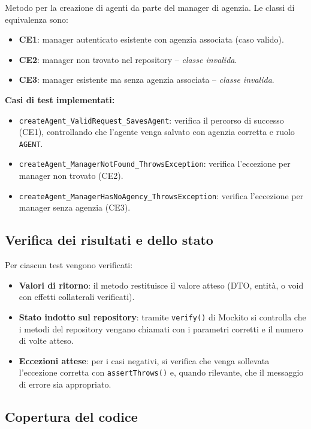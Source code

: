 \documentclass[a4paper,11pt]{report}
\begin{document}
Metodo per la creazione di agenti da parte del manager di agenzia. Le classi di equivalenza sono:

\begin{itemize}[nosep]
  \item \textbf{CE1}: manager autenticato esistente con agenzia associata (caso valido).
  \item \textbf{CE2}: manager non trovato nel repository -- \emph{classe invalida}.
  \item \textbf{CE3}: manager esistente ma senza agenzia associata -- \emph{classe invalida}.
\end{itemize}

\textbf{Casi di test implementati:}

\begin{itemize}[nosep]
  \item \texttt{createAgent\_ValidRequest\_SavesAgent}: verifica il percorso di successo (CE1), controllando che l'agente venga salvato con agenzia corretta e ruolo \texttt{AGENT}.
  \item \texttt{createAgent\_ManagerNotFound\_ThrowsException}: verifica l'eccezione per manager non trovato (CE2).
  \item \texttt{createAgent\_ManagerHasNoAgency\_ThrowsException}: verifica l'eccezione per manager senza agenzia (CE3).
\end{itemize}

\subsection{Verifica dei risultati e dello stato}

Per ciascun test vengono verificati:

\begin{itemize}[nosep]
  \item \textbf{Valori di ritorno}: il metodo restituisce il valore atteso (DTO, entità, o void con effetti collaterali verificati).
  \item \textbf{Stato indotto sul repository}: tramite \texttt{verify()} di Mockito si controlla che i metodi del repository vengano chiamati con i parametri corretti e il numero di volte atteso.
  \item \textbf{Eccezioni attese}: per i casi negativi, si verifica che venga sollevata l'eccezione corretta con \texttt{assertThrows()} e, quando rilevante, che il messaggio di errore sia appropriato.
\end{itemize}

\subsection{Copertura del codice}
\end{document}
